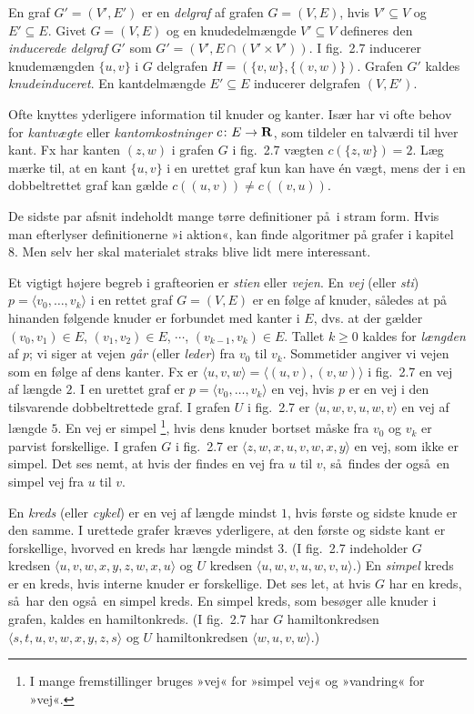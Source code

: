 En graf $G'= (V', E')$ er en \emph{delgraf} af grafen $G=(V,E)$, hvis $V'\subseteq V$ og $E'\subseteq E$.
Givet $G=(V,E)$ og en knudedelmængde $V'\subseteq V$ defineres den \emph{inducerede delgraf} $G'$ 
som $G' = (V', E\cap (V'\times V'))$.
I fig.~2.7 inducerer knudemængden $\{u,v\}$ i $G$ delgrafen $H = (\{v,w\}, \{(v,w)\})$.
Grafen $G'$ kaldes \emph{knudeinduceret}.
En kantdelmængde $E'\subseteq E$ inducerer delgrafen $(V,E')$.

Ofte knyttes yderligere information til knuder og kanter.
Især har vi ofte behov for \emph{kantvægte} eller \emph{kantomkostninger} $c\colon E\rightarrow \mathbf R$, som tildeler en talværdi til hver kant.
Fx har kanten $(z,w)$ i grafen $G$ i fig.~2.7 vægten $c(\{z,w\}) = 2$.
Læg mærke til, at en kant $\{u,v\}$ i en urettet graf kun kan have én vægt, mens der i en dobbeltrettet graf kan gælde $c((u,v)) \neq c((v,u))$.

De sidste par afsnit indeholdt mange tørre definitioner på i stram form.
Hvis man efterlyser definitionerne »i aktion«, kan finde algoritmer på grafer i kapitel 8.
Men selv her skal materialet straks blive lidt mere interessant.

Et vigtigt højere begreb i grafteorien er \emph{stien} eller \emph{vejen}.
En \emph{vej} (eller \emph{sti}) $p=\langle v_0,\ldots, v_k\rangle$ i en rettet graf $G=(V,E)$ er en følge af knuder, således at på hinanden følgende knuder er forbundet med kanter i $E$, dvs. at der gælder 
$(v_0,v_1)\in E$, 
$(v_1,v_2)\in E$, $\cdots$,
$(v_{k-1},v_k)\in E$.
Tallet $k\geq 0$ kaldes for \emph{længden} af $p$; vi siger at vejen \emph{går} (eller \emph{leder}) fra $v_0$ til $v_k$.
Sommetider angiver vi vejen som en følge af dens kanter.
Fx er $\langle u,v,w\rangle= \langle (u,v), (v,w)\rangle$ i fig.~2.7 en vej af længde $2$.
I en urettet graf er $p=\langle v_0,\ldots, v_k\rangle$ en vej, hvis $p$ er en vej i den tilsvarende dobbeltrettede graf.
I grafen $U$ i fig.~2.7 er $\langle u,w,v,u, w,v\rangle$ en vej af længde $5$.
En vej er simpel%
\footnote{I mange fremstillinger bruges »vej« for »simpel vej« og »vandring« for »vej«.},
hvis dens knuder bortset måske fra $v_0$ og $v_k$ er parvist forskellige.
I grafen $G$ i fig.~2.7 er $\langle z,w,x,u,v,w,x,y\rangle$ en vej, som ikke er simpel.
Det ses nemt, at hvis der findes en vej fra $u$ til $v$, så findes der også en simpel vej fra $u$ til $v$.

En \emph{kreds} (eller \emph{cykel}) er en vej af længde mindst $1$, hvis første og sidste knude er den samme.
I urettede grafer kræves yderligere, at den første og sidste kant er forskellige, hvorved en kreds har længde mindst $3$.
(I fig.~2.7 indeholder $G$ kredsen $\langle u,v,w,x,y,z,w,x,u\rangle$ og $U$ kredsen $\langle u, w, v, u, w, v, u\rangle$.)
En \emph{simpel} kreds er en kreds, hvis interne knuder er forskellige.
Det ses let, at hvis $G$ har en kreds, så har den også en simpel kreds.
En simpel kreds, som besøger alle knuder i grafen, kaldes en hamiltonkreds.
(I fig.~2.7 har $G$ hamiltonkredsen $\langle s,t,u,v,w,x,y,z,s\rangle$ og $U$ hamiltonkredsen $\langle w,u,v,w\rangle$.)

